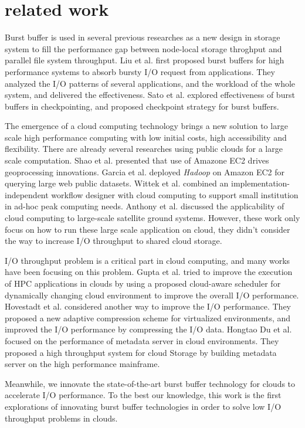 \section{related work}
\label{sec:related work}

Burst buffer is used in several previous researches as a new design in storage
system to fill the performance gap between node-local storage throghput and
parallel file system throughput.
Liu et al. \cite{on_the_role_of_burst_buffers} first proposed burst buffers for
high performance systems to absorb bursty I/O request from applications. 
They analyzed the I/O patterns of several applications, and the workload of the
whole system, and delivered the effectiveness.
Sato et al.\cite{checkpointing} explored effectiveness of burst buffers in
checkpointing, and proposed checkpoint strategy for burst buffers.

The emergence of a cloud computing technology brings a new solution to large
scale high performance computing with low initial costs, high accessibility and flexibility.
There are already several researches using public clouds for a large scale
computation.
Shao et al.\cite{Geoprocessing_on_the_Amazon_cloud_computing_platform} presented
that use of Amazone EC2 drives geoprocessing innovations.
Garcia et al.\cite{Analysis_of_Big_Data_Technologies_and_Method} deployed
\emph{Hadoop} on Amazon EC2 for querying large web public datasets.
Wittek et al.\cite{XML_Processing_in_the_Cloud} combined an
implementation-independent workflow designer with cloud computing to support small institution in ad-hoc
peak computing needs.
Anthony et
al.\cite{Cloud_computing_applications_for_large-scale_satellite_ground_systems}
discussed the applicability of cloud computing to large-scale satellite ground systems.
However, these work only focus on how to run these large scale application on
cloud, they didn't consider the way to increase I/O throughput to shared
cloud storage.

I/O throughput problem is a critical part in cloud computing, and many works
have been focusing on this problem.
Gupta et al.\cite{Towards_Efficient_Mapping} tried to improve the
execution of HPC applications in clouds by using a proposed cloud-aware
scheduler for dynamically changing cloud environment to improve the overall
I/O performance.
Hovestadt et al.\cite{Evaluating_Adaptive_Compression} considered another way to
improve the I/O performance.
They proposed a new adaptive compression scheme for virtualized environments,
and improved the I/O performance by compressing the I/O data.
Hongtao Du et
al.\cite{DHFS:_A_High-Throughput_Heterogeneous_File_System_Based_on_Mainframe_for_Cloud_Storage}
focused on the performance of metadata server in cloud environments. They
proposed a high throughput system for cloud Storage by building metadata server on the high performance mainframe.

Meanwhile, we innovate the state-of-the-art burst buffer technology for clouds
to accelerate I/O performance. To the best our knowledge, this work is the first explorations
of innovating burst buffer technologies in order to solve low I/O throughput
problems in clouds.

